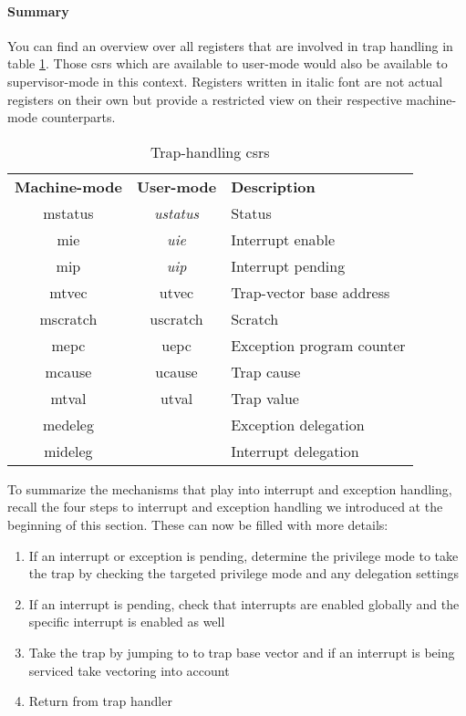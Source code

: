 \paragraph{Summary}
You can find an overview over all registers that are involved in trap handling in table \ref{tbl:trap-csrs}.
Those \glspl{csr} which are available to user-mode would also be available to supervisor-mode in this context.
Registers written in italic font are not actual registers on their own but provide a restricted view on their respective machine-mode counterparts.

\begin{table}
    \centering
    \begin{tabular}{| c c || l |}
        \hline
        \textbf{Machine-mode} & \textbf{User-mode} & \textbf{Description} \\
        \acrshort{mstatus} & \textit{\acrshort{ustatus}} & Status \\
        \acrshort{mie} & \textit{\acrshort{uie}} & Interrupt enable \\
        \acrshort{mip} & \textit{\acrshort{uip}} & Interrupt pending \\
        \acrshort{mtvec} & \acrshort{utvec} & Trap-vector base address \\
        \acrshort{mscratch} & \acrshort{uscratch} & Scratch \\
        \acrshort{mepc} & \acrshort{uepc} & Exception program counter \\
        \acrshort{mcause} & \acrshort{ucause} & Trap cause \\
        \acrshort{mtval} & \acrshort{utval} & Trap value \\
        \acrshort{medeleg} & & Exception delegation \\
        \acrshort{mideleg} & & Interrupt delegation \\
        \hline
    \end{tabular}
    \caption{Trap-handling \glspl{csr}}
    \label{tbl:trap-csrs}
\end{table}

To summarize the mechanisms that play into interrupt and exception handling, recall the four steps to interrupt and exception handling we introduced at the beginning of this section.
These can now be filled with more details:
\begin{enumerate}
    \item If an interrupt or exception is pending, determine the privilege mode to take the trap by checking the targeted privilege mode and any delegation settings
    \item If an interrupt is pending, check that interrupts are enabled globally and the specific interrupt is enabled as well
    \item Take the trap by jumping to to trap base vector and if an interrupt is being serviced take vectoring into account
    \item Return from trap handler
\end{enumerate}

